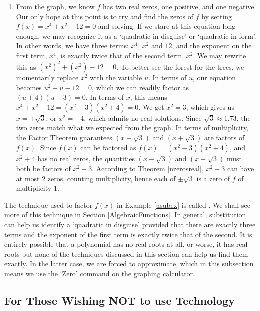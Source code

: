 {\begin{enumerate}
\item  From the graph, we know $f$ has two real zeros, one positive, and one negative.  Our only hope at this point is to try and find the zeros of $f$ by setting $f(x)=x^4+x^2-12=0$ and solving.  If we stare at this equation long enough, we may recognize it as a `quadratic in disguise' or `quadratic in form'.   In other words, we have three terms: $x^4$, $x^2$ and $12$, and the exponent on the first term, $x^4$, is exactly twice that of the second term, $x^2$.  We may rewrite this as $\left(x^2\right)^2 + \left(x^2\right) - 12 = 0$.  To better see the forest for the trees, we momentarily replace $x^2$ with the variable $u$.  In terms of $u$, our equation becomes $u^2 + u - 12 = 0$, which we can readily factor as $(u+4)(u-3) = 0$.  In terms of $x$, this means $x^4+x^2-12= \left(x^2-3\right) \left(x^2 + 4 \right)=0$. We get $x^2 = 3$, which gives us $x = \pm \sqrt{3}$, or $x^2=-4$, which admits no real solutions.  Since $\sqrt{3} \approx 1.73$, the two zeros match what we expected from the graph.  In terms of multiplicity, the Factor Theorem guarantees $\left(x - \sqrt{3}\right)$ and $\left(x + \sqrt{3}\right)$ are factors of $f(x)$.  Since $f(x)$ can be factored as $f(x) = \left(x^2-3\right) \left(x^2 + 4 \right)$, and $x^2 + 4$ has no real zeros, the quantities $\left(x - \sqrt{3}\right)$ and $\left(x + \sqrt{3}\right)$ must both be factors of $x^2-3$.  According to Theorem \ref{nzerosreal}, $x^2-3$ can have at most $2$ zeros, counting multiplicity, hence each of $\pm \sqrt{3}$ is a zero of $f$ of multiplicity $1$. 

\end{enumerate}
}

The technique used to factor $f(x)$ in Example \ref{usubex} is called  .  We shall see more of this technique in Section \ref{AlgebraicFunctions}.  In general, substitution can help us identify a `quadratic in disguise' provided that there are exactly three terms and the exponent of the first term is exactly twice that of the second.  It is entirely possible that a polynomial has no real roots at all, or worse, it has real roots but none of the techniques discussed in this section can help us find them exactly.  In the latter case, we are forced to approximate, which in this subsection means we use the `Zero' command on the graphing calculator.  


\subsection{For Those Wishing NOT to use Technology}

